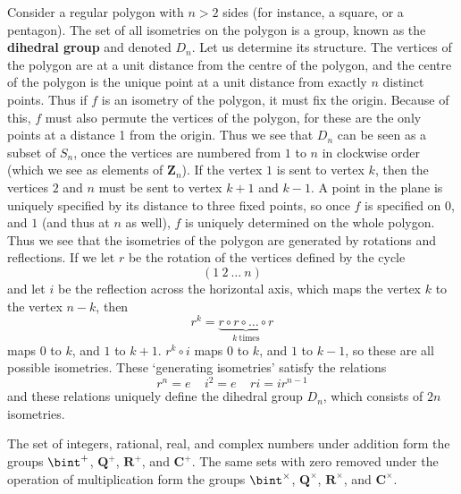 \begin{example}
    Consider a regular polygon with $n > 2$ sides (for instance, a square, or a pentagon). The set of all isometries on the polygon is a group, known as the {\bf dihedral group} and denoted $D_n$. Let us determine its structure. The vertices of the polygon are at a unit distance from the centre of the polygon, and the centre of the polygon is the unique point at a unit distance from exactly $n$ distinct points. Thus if $f$ is an isometry of the polygon, it must fix the origin. Because of this, $f$ must also permute the vertices of the polygon, for these are the only points at a distance 1 from the origin. Thus we see that $D_n$ can be seen as a subset of $S_n$, once the vertices are numbered from $1$ to $n$ in clockwise order (which we see as elements of $\mathbf{Z}_n$). If the vertex $1$ is sent to vertex $k$, then the vertices $2$ and $n$ must be sent to vertex $k+1$ and $k-1$. A point in the plane is uniquely specified by its distance to three fixed points, so once $f$ is specified on $0$, and $1$ (and thus at $n$ as well), $f$ is uniquely determined on the whole polygon. Thus we see that the isometries of the polygon are generated by rotations and reflections. If we let $r$ be the rotation of the vertices defined by the cycle
    \[ (1\ 2\ \dots\ n) \]
    and let $i$ be the reflection across the horizontal axis, which maps the vertex $k$ to the vertex $n - k$, then
    \[ r^k = \underbrace{r \circ r \circ \dots \circ r}_{k\ \text{times}} \]
    maps $0$ to $k$, and $1$ to $k+1$. $r^k \circ i$ maps $0$ to $k$, and $1$ to $k-1$, so these are all possible isometries. These `generating isometries' satisfy the relations
    \[ r^n = e\ \ \ \ \ i^2 = e\ \ \ \ \ ri = ir^{n-1} \]
    and these relations uniquely define the dihedral group $D_n$, which consists of $2n$ isometries.
\end{example}

\begin{example}
    The set of integers, rational, real, and complex numbers under addition form the groups $\bint^+$, $\mathbf{Q}^+$, $\mathbf{R}^+$, and $\mathbf{C}^+$. The same sets with zero removed under the operation of multiplication form the groups $\bint^\times$, $\mathbf{Q}^\times$, $\mathbf{R}^\times$, and $\mathbf{C}^\times$.
\end{example}